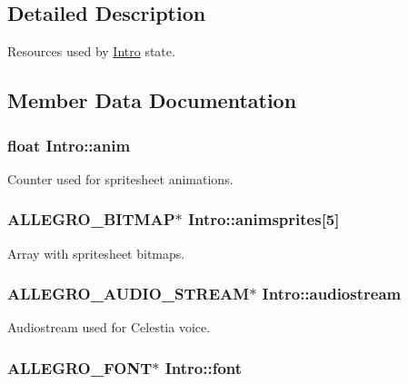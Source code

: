 \subsection{\-Detailed \-Description}
\-Resources used by \hyperlink{structIntro}{\-Intro} state. 

\subsection{\-Member \-Data \-Documentation}
\hypertarget{structIntro_a7bac02ef374847f0efbe638892cb401f}{
\subsubsection[{anim}]{\setlength{\rightskip}{0pt plus 5cm}float {\bf \-Intro\-::anim}}}\label{structIntro_a7bac02ef374847f0efbe638892cb401f}
\-Counter used for spritesheet animations. \hypertarget{structIntro_ae89a2ad7dfed9e06a558a5f92bba55bc}{
\subsubsection[{animsprites}]{\setlength{\rightskip}{0pt plus 5cm}\-A\-L\-L\-E\-G\-R\-O\-\_\-\-B\-I\-T\-M\-A\-P$\ast$ {\bf \-Intro\-::animsprites}\mbox{[}5\mbox{]}}}\label{structIntro_ae89a2ad7dfed9e06a558a5f92bba55bc}
\-Array with spritesheet bitmaps. \hypertarget{structIntro_a879aa48597b2f7b6fbeb9f9911234350}{
\subsubsection[{audiostream}]{\setlength{\rightskip}{0pt plus 5cm}\-A\-L\-L\-E\-G\-R\-O\-\_\-\-A\-U\-D\-I\-O\-\_\-\-S\-T\-R\-E\-A\-M$\ast$ {\bf \-Intro\-::audiostream}}}\label{structIntro_a879aa48597b2f7b6fbeb9f9911234350}
\-Audiostream used for \-Celestia voice. \hypertarget{structIntro_a896d4fdd74cf47535173eeaa6e81f734}{
\subsubsection[{font}]{\setlength{\rightskip}{0pt plus 5cm}\-A\-L\-L\-E\-G\-R\-O\-\_\-\-F\-O\-N\-T$\ast$ {\bf \-Intro\-::font}}}\label{structIntro_a896d4fdd74cf47535173eeaa6e81f734}
